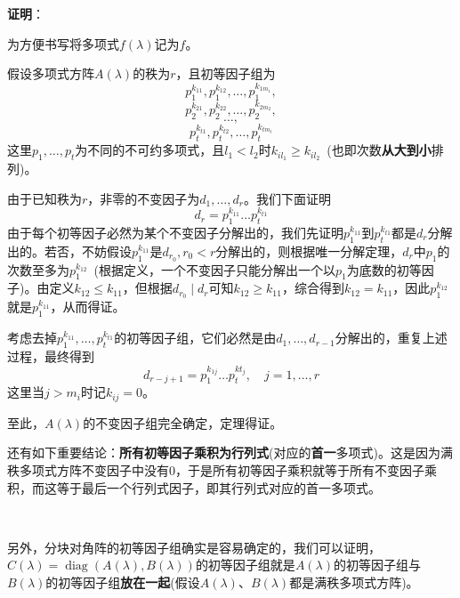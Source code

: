 \documentclass[a4paper,UTF8,fontset=windows,AutoFakeBold]{ctexart}
\DeclareMathOperator{\diag}{diag}
\newcommand*{\note}{\noindent *}
\newcommand{\proo}[1]{{\vspace{5pt}\kaishu\noindent\textbf{证明}：\vspace{-3pt}
\begin{compactitem}
    \item[] #1
\end{compactitem}
}}
\begin{document}
\proo{
    为方便书写将多项式$f(\lambda)$记为$f$。
    
    假设多项式方阵$A(\lambda)$的秩为$r$，且初等因子组为
    $$p_1^{k_{11}},p_1^{k_{12}},\dots,p_1^{k_{1m_1}},$$
    $$p_2^{k_{21}},p_2^{k_{22}},\dots,p_2^{k_{2m_2}},$$
    $$\dots,$$
    $$p_t^{k_{t1}},p_t^{k_{t2}},\dots,p_t^{k_{tm_t}}$$
    这里$p_1,\dots,p_t$为不同的不可约多项式，且$l_1<l_2$时$k_{il_1}\ge k_{il_2}$\ (也即次数\textbf{从大到小}排列)。

    由于已知秩为$r$，非零的不变因子为$d_1,\dots,d_r$。我们下面证明
    $$d_r=p_1^{k_{11}}\dots p_t^{k_{t1}}$$
    由于每个初等因子必然为某个不变因子分解出的，我们先证明$p_1^{k_{11}}$到$p_t^{k_{t1}}$都是$d_r$分解出的。若否，不妨假设$p_1^{k_{11}}$是$d_{r_0},r_0<r$分解出的，则根据唯一分解定理，$d_r$中$p_1$的次数至多为$p_1^{k_{12}}$\ (根据定义，一个不变因子只能分解出一个以$p_1$为底数的初等因子)。由定义$k_{12}\le k_{11}$，但根据$d_{r_0}\mid d_r$可知$k_{12}\ge k_{11}$，综合得到$k_{12}=k_{11}$，因此$p_1^{k_{12}}$就是$p_1^{k_{11}}$，从而得证。

    考虑去掉$p_1^{k_{11}},\dots,p_t^{k_{t1}}$的初等因子组，它们必然是由$d_1,\dots,d_{r-1}$分解出的，重复上述过程，最终得到
    $$d_{r-j+1}=p_1^{k_{1j}}\dots p_t^{kt_j},\quad j=1,\dots,r$$
    这里当$j>m_i$时记$k_{ij}=0$。

    至此，$A(\lambda)$的不变因子组完全确定，定理得证。
}

\note 还有如下重要结论：\textbf{所有初等因子乘积为行列式}(对应的\textbf{首一}多项式)。这是因为满秩多项式方阵不变因子中没有0，于是所有初等因子乘积就等于所有不变因子乘积，而这等于最后一个行列式因子，即其行列式对应的首一多项式。

\

另外，分块对角阵的初等因子组确实是容易确定的，我们可以证明，$C(\lambda)=\diag(A(\lambda),B(\lambda))$的初等因子组就是$A(\lambda)$的初等因子组与$B(\lambda)$的初等因子组\textbf{放在一起}(假设$A(\lambda)$、$B(\lambda)$都是满秩多项式方阵)。
\end{document}
